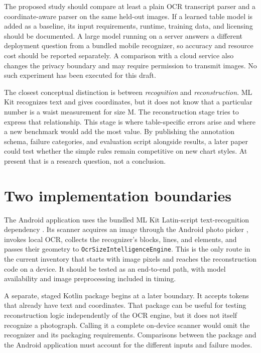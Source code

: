 \documentclass[10pt,letterpaper]{article}
\begin{document}
The proposed study should compare at least a plain OCR transcript parser and a coordinate-aware parser on the same held-out images. If a learned table model is added as a baseline, its input requirements, runtime, training data, and licensing should be documented. A large model running on a server answers a different deployment question from a bundled mobile recognizer, so accuracy and resource cost should be reported separately. A comparison with a cloud service also changes the privacy boundary and may require permission to transmit images. No such experiment has been executed for this draft.

The closest conceptual distinction is between \emph{recognition} and \emph{reconstruction}. ML Kit recognizes text and gives coordinates, but it does not know that a particular number is a waist measurement for size M. The reconstruction stage tries to express that relationship. This stage is where table-specific errors arise and where a new benchmark would add the most value. By publishing the annotation schema, failure categories, and evaluation script alongside results, a later paper could test whether the simple rules remain competitive on new chart styles. At present that is a research question, not a conclusion.

\section{Two implementation boundaries}

The Android application uses the bundled ML Kit Latin-script text-recognition dependency \cite{r1}. Its scanner acquires an image through the Android photo picker \cite{r4}, invokes local OCR, collects the recognizer's blocks, lines, and elements, and passes their geometry to \texttt{OcrSizeIntelligenceEngine}. This is the only route in the current inventory that starts with image pixels and reaches the reconstruction code on a device. It should be tested as an end-to-end path, with model availability and image preprocessing included in timing.

A separate, staged Kotlin package begins at a later boundary. It accepts tokens that already have text and coordinates. That package can be useful for testing reconstruction logic independently of the OCR engine, but it does not itself recognize a photograph. Calling it a complete on-device scanner would omit the recognizer and its packaging requirements. Comparisons between the package and the Android application must account for the different inputs and failure modes.
\end{document}
